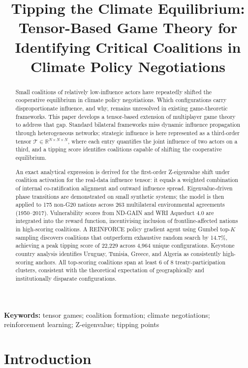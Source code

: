 \documentclass[11pt]{article}
\title{\textbf{Tipping the Climate Equilibrium: Tensor-Based Game Theory for Identifying Critical Coalitions in Climate Policy Negotiations}}
\author{}
\date{}
\newcommand{\keywords}[1]{\par\noindent\textbf{Keywords:} #1}
\begin{document}
\maketitle

\begin{abstract}
Small coalitions of relatively low-influence actors have repeatedly shifted the cooperative equilibrium in climate policy negotiations. Which configurations carry disproportionate influence, and why, remains unresolved in existing game-theoretic frameworks. This paper develops a tensor-based extension of multiplayer game theory to address that gap. Standard bilateral frameworks miss dynamic influence propagation through heterogeneous networks; strategic influence is here represented as a third-order tensor $\mathcal{T} \in \mathbb{R}^{N \times N \times N}$, where each entry quantifies the joint influence of two actors on a third, and a tipping score identifies coalitions capable of shifting the cooperative equilibrium.

An exact analytical expression is derived for the first-order Z-eigenvalue shift under coalition activation for the real-data influence tensor: it equals a weighted combination of internal co-ratification alignment and outward influence spread. Eigenvalue-driven phase transitions are demonstrated on small synthetic systems; the model is then applied to 175 non-G20 nations across 263 multilateral environmental agreements (1950--2017). Vulnerability scores from ND-GAIN and WRI Aqueduct 4.0 are integrated into the reward function, incentivising inclusion of frontline-affected nations in high-scoring coalitions. A REINFORCE policy gradient agent using Gumbel top-$K$ sampling discovers coalitions that outperform exhaustive random search by 14.7\%, achieving a peak tipping score of 22,229 across 4,964 unique configurations. Keystone country analysis identifies Uruguay, Tunisia, Greece, and Algeria as consistently high-scoring anchors. All top-scoring coalitions span at least 6 of 8 treaty-participation clusters, consistent with the theoretical expectation of geographically and institutionally disparate configurations.
\end{abstract}

\keywords{tensor games; coalition formation; climate negotiations; reinforcement learning; Z-eigenvalue; tipping points}

\section{Introduction}
\label{sec:intro}
\end{document}
